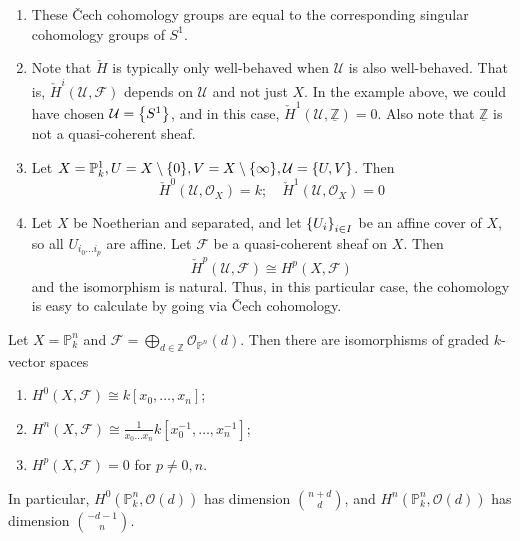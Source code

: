 \begin{remark}
	\begin{enumerate}
		\item These \v{C}ech cohomology groups are equal to the corresponding singular cohomology groups of \( S^1 \).
		\item Note that \( \check{H} \) is typically only well-behaved when \( \mathcal U \) is also well-behaved.
		That is, \( \check{H}^i(\mathcal U, \mathcal F) \) depends on \( \mathcal U \) and not just \( X \).
		In the example above, we could have chosen \( \mathcal U = \qty{S^1} \), and in this case, \( \check{H}^1(\mathcal U, \underline{\mathbb Z}) = 0 \).
		Also note that \( \underline{\mathbb Z} \) is not a quasi-coherent sheaf.
		\item Let \( X = \mathbb P^1_k, U = X \setminus \qty{0}, V = X \setminus \qty{\infty}, \mathcal U = \qty{U, V} \).
		Then
		\[ \check{H}^0(\mathcal U, \mathcal O_X) = k;\quad \check{H}^1(\mathcal U, \mathcal O_X) = 0 \]
		\item Let \( X \) be Noetherian and separated, and let \( \qty{U_i}_{i \in I} \) be an affine cover of \( X \), so all \( U_{i_0 \dots i_p} \) are affine.
		Let \( \mathcal F \) be a quasi-coherent sheaf on \( X \).
		Then
		\[ \check{H}^p(\mathcal U, \mathcal F) \cong H^p(X, \mathcal F) \]
		and the isomorphism is natural.
		Thus, in this particular case, the cohomology is easy to calculate by going via \v{C}ech cohomology.
	\end{enumerate}
\end{remark}
\begin{theorem}
	Let \( X = \mathbb P^n_k \) and \( \mathcal F = \bigoplus_{d \in \mathbb Z} \mathcal O_{\mathbb P^n}(d) \).
	Then there are isomorphisms of graded \( k \)-vector spaces
	\begin{enumerate}
		\item \( H^0(X, \mathcal F) \cong k[x_0, \dots, x_n] \);
		\item \( H^n(X, \mathcal F) \cong \frac{1}{x_0 \dots x_n} k[x_0^{-1}, \dots, x_n^{-1}] \);
		\item \( H^p(X, \mathcal F) = 0 \) for \( p \neq 0, n \).
	\end{enumerate}
	In particular, \( H^0(\mathbb P^n_k, \mathcal O(d)) \) has dimension \( \binom{n+d}{d} \), and \( H^n(\mathbb P^n_k, \mathcal O(d)) \) has dimension \( \binom{-d-1}{n} \).
\end{theorem}
